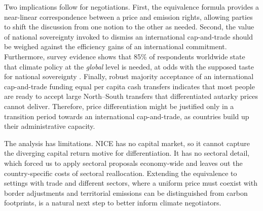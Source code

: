 \documentclass[12pt,english]{article}
\newif\ifblind
\theoremstyle{remark}
\begin{document}
Two implications follow for negotiations. First, the equivalence formula provides a near-linear correspondence between a price and emission rights, allowing parties to shift the discussion from one notion to the other as needed. %
Second, the value of national sovereignty invoked to dismiss an international cap-and-trade should be weighed against the efficiency gains of an international commitment. %
Furthermore, survey evidence shows %
that 85\% of respondents worldwide state that climate policy at the \textit{global} level is needed, at odds with the supposed taste for national sovereignty \citep{fabre_majority_2025}. Finally, robust majority acceptance of an international cap-and-trade funding equal per capita cash transfers indicates that most people are ready to accept large North--South transfers that differentiated autarky prices cannot deliver. Therefore, price differentiation might be justified only in a transition period towards an international cap-and-trade, as countries build up their administrative capacity.

The analysis has limitations. NICE has no capital market, %
so it cannot capture the diverging capital return motive %
for differentiation. 
It has no sectoral detail, which forced us to apply sectoral proposals economy-wide and leaves out the country-specific costs of sectoral reallocation. %
Extending the equivalence to settings with trade and different sectors, where a uniform price must coexist with border adjustments and territorial emissions can be distinguished from carbon footprints, is a natural next step to better inform climate negotiators.

\end{document}
